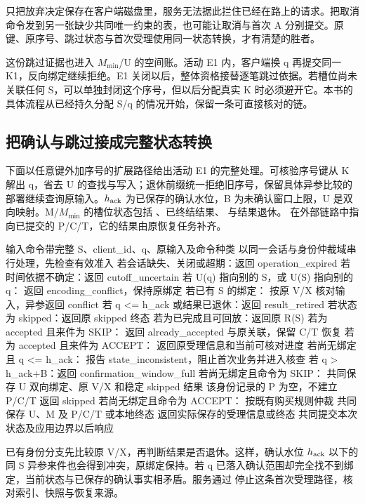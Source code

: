 
只把放弃决定保存在客户端磁盘里，服务无法据此拦住已经在路上的请求。把取消命令发到另一张缺少共同唯一约束的表，也可能让取消与首次 A 分别提交。原键、原序号、跳过状态与首次受理使用同一状态转换，才有清楚的胜者。

这份跳过证据也进入 $M_{\min}$/U 的空间账。活动 E1 内，客户端换 q 再提交同一 K1，反向绑定继续拒绝。E1 关闭以后，整体资格接替逐笔跳过依据。若槽位尚未关联任何 S，可以单独封闭这个序号，但以后分配真实 K 时必须避开它。本书的具体流程从已经持久分配 S/q 的情况开始，保留一条可直接核对的链。

\subsection*{把确认与跳过接成完整状态转换}

下面以任意键外加序号的扩展路径给出活动 E1 的完整处理。可核验序号键从 K 解出 q，省去 U 的查找与写入；退休前缀统一拒绝旧序号，保留具体异参比较的部署继续查询原输入。$h_{\rm ack}$ 为已保存的确认水位，B 为未确认窗口上限，U 是双向映射。M/$M_{\min}$ 的槽位状态包括 、已终结结果、 与结果退休。 在外部链路中指向已提交的 P/C/T，它的结果由原恢复任务补齐。

\begin{BookCode}
输入命令带完整 S、client_id、q、原输入及命令种类
以同一会话与身份仲裁域串行处理，先检查有效准入
若会话缺失、关闭或超期：返回 operation_expired
若时间依据不确定：返回 cutoff_uncertain
若 U(q) 指向别的 S，或 U(S) 指向别的 q：
    返回 encoding_conflict，保持原绑定
若已有 S 的绑定：
    按原 V/X 核对输入，异参返回 conflict
    若 q <= h_ack 或结果已退休：返回 result_retired
    若状态为 skipped：返回原 skipped 终态
    若为已完成且可回放：返回原 R(S)
    若为 accepted 且来件为 SKIP：
        返回 already_accepted 与原关联，保留 C/T 恢复
    若为 accepted 且来件为 ACCEPT：
        返回原受理信息和当前可核对进度
若尚无绑定且 q <= h_ack：
    报告 state_inconsistent，阻止首次业务并进入核查
若 q > h_ack+B：返回 confirmation_window_full
若尚无绑定且命令为 SKIP：
    共同保存 U 双向绑定、原 V/X 和稳定 skipped 结果
    该身份记录的 P 为空，不建立 P/C/T
    返回 skipped
若尚无绑定且命令为 ACCEPT：
    按既有购买规则仲裁
    共同保存 U、M 及 P/C/T 或本地终态
    返回实际保存的受理信息或终态
共同提交本次状态及应用边界以后响应
\end{BookCode}

已有身份分支先比较原 V/X，再判断结果是否退休。这样，确认水位 $h_{\rm ack}$ 以下的同 S 异参来件也会得到冲突，原绑定保持。若 q 已落入确认范围却完全找不到绑定，当前状态与已保存的确认事实相矛盾。服务通过  停止这条首次受理路径，核对索引、快照与恢复来源。

